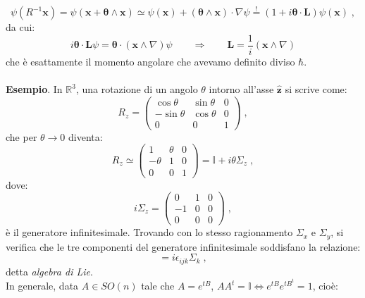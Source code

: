 \documentclass[10pt,a4paper]{report}
\theoremstyle{definition}
\numberwithin{equation}{section}
\begin{document}
\begin{equation}
\psi(R^{-1}\mathbf{x})=\psi(\mathbf{x}+\boldsymbol{\theta}\wedge\mathbf{x})\simeq \psi(\mathbf{x})+(\boldsymbol{\theta} \wedge \mathbf{x})\cdot \nabla\psi \stackrel{!}{=} (1+i\boldsymbol{\theta}\cdot\mathbf{L})\psi(\mathbf{x})\;,
\end{equation}
da cui:
\begin{equation}
i\boldsymbol{\theta}\cdot\mathbf{L}\psi=\boldsymbol{\theta}\cdot(\mathbf{x}\wedge \nabla)\psi \qquad \Longrightarrow \qquad \mathbf{L}=\frac{1}{i}(\mathbf{x}\wedge\nabla)
\end{equation}
che è esattamente il momento angolare che avevamo definito diviso $\hbar$. \\
\\
\textbf{Esempio}. In $\mathbb{R}^3$, una rotazione di un angolo $\theta$ intorno all'asse $\hat{\mathbf{z}}$ si scrive come:
\begin{equation}
R_z=\left(\begin{matrix}
\cos\theta & \sin\theta & 0 \\
-\sin\theta & \cos\theta & 0 \\
0 & 0 & 1
\end{matrix}\right)\;,
\end{equation}
che per $\theta\to 0$ diventa:
\begin{equation}
R_z\simeq\left(\begin{matrix}
1 & \theta & 0 \\
-\theta & 1 & 0 \\
0 & 0 & 1
\end{matrix}\right)=\mathbb{I}+i\theta\Sigma_z\;,
\end{equation}
dove:
\begin{equation}
i\Sigma_z=\left(\begin{matrix}
0 & 1 & 0 \\
-1 & 0 & 0 \\
0 & 0 & 0
\end{matrix}\right)\;,
\end{equation}
è il generatore infinitesimale. Trovando con lo stesso ragionamento $\Sigma_x$ e $\Sigma_y$, si verifica che le tre componenti del generatore infinitesimale soddisfano la relazione:
\begin{equation}
[\Sigma_i,\Sigma_j]=i\epsilon_{ijk}\Sigma_k\;,
\end{equation}
detta \textit{algebra di Lie}. \\
In generale, data $A\in SO(n)$ tale che $A=e^{tB}$, $AA^t=\mathbb{I}\Longleftrightarrow e^{tB}e^{tB^t}=1$, cioè:
\end{document}
